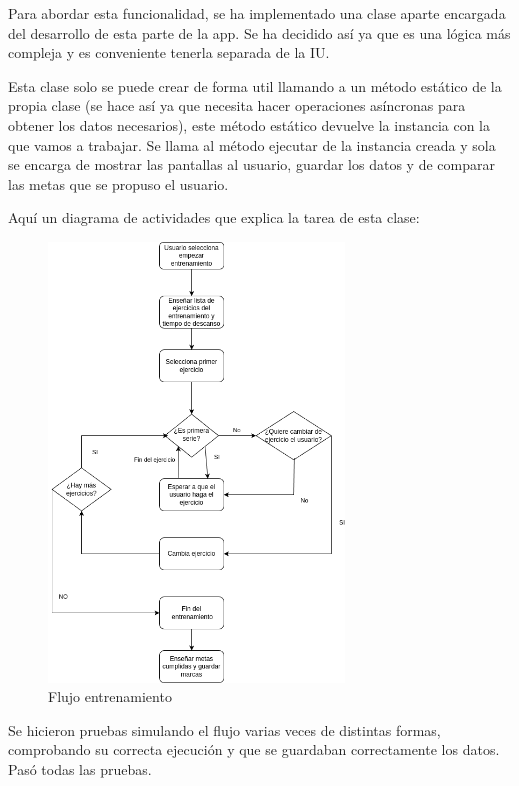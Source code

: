 Para abordar esta funcionalidad, se ha implementado una clase aparte encargada del desarrollo de esta parte de la app. Se ha decidido así ya que es una lógica más compleja y es conveniente tenerla separada de la IU.

Esta clase solo se puede crear de forma util llamando a un método estático de la propia clase (se hace así ya que necesita hacer operaciones asíncronas para obtener los datos necesarios), este método estático devuelve la instancia con la que vamos a trabajar. Se llama al método ejecutar de la instancia creada y sola se encarga de mostrar las pantallas al usuario, guardar los datos y de comparar las metas que se propuso el usuario.

Aquí un diagrama de actividades que explica la tarea de esta clase:

\begin{figure}[H]
    \centering
    \includegraphics[width=0.7\textwidth]{tablas/FlujoEntrenamiento.png}
    \caption{Flujo entrenamiento}
    \label{fig:Flujo entrenamiento}
\end{figure}

Se hicieron pruebas simulando el flujo varias veces de distintas formas, comprobando su correcta ejecución y que se guardaban correctamente los datos. Pasó todas las pruebas.

